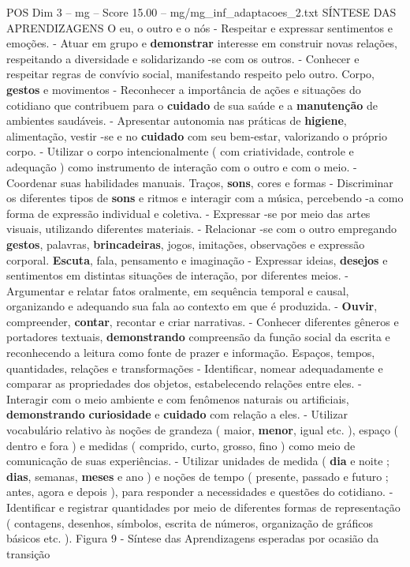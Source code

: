 \begin{textsample}{POS Dim 3 – mg – Score 15.00 – mg/mg\_inf\_adaptacoes\_2.txt}  \label{ex:f3_pos_268}
SÍNTESE DAS APRENDIZAGENS O eu, o outro e o nós - Respeitar e expressar sentimentos e emoções. - Atuar em grupo e \textbf{demonstrar} interesse em construir novas relações, respeitando a diversidade e solidarizando -se com os outros. - Conhecer e respeitar regras de convívio social, manifestando respeito pelo outro.
Corpo, \textbf{gestos} e movimentos - Reconhecer a importância de ações e situações do cotidiano que contribuem para o \textbf{cuidado} de sua saúde e a \textbf{manutenção} de ambientes saudáveis. - Apresentar autonomia nas práticas de \textbf{higiene}, alimentação, vestir -se e no \textbf{cuidado} com seu bem-estar, valorizando o próprio corpo. - Utilizar o corpo intencionalmente ( com criatividade, controle e adequação ) como instrumento de interação com o outro e com o meio. - Coordenar suas habilidades manuais.
Traços, \textbf{sons}, cores e formas - Discriminar os diferentes tipos de \textbf{sons} e ritmos e interagir com a música, percebendo -a como forma de expressão individual e coletiva. - Expressar -se por meio das artes visuais, utilizando diferentes materiais. - Relacionar -se com o outro empregando \textbf{gestos}, palavras, \textbf{brincadeiras}, jogos, imitações, observações e expressão corporal. \textbf{Escuta}, fala, pensamento e imaginação - Expressar ideias, \textbf{desejos} e sentimentos em distintas situações de interação, por diferentes meios. - Argumentar e relatar fatos oralmente, em sequência temporal e causal, organizando e adequando sua fala ao contexto em que é produzida. - \textbf{Ouvir}, compreender, \textbf{contar}, recontar e criar narrativas. - Conhecer diferentes gêneros e portadores textuais, \textbf{demonstrando} compreensão da função social da escrita e reconhecendo a leitura como fonte de prazer e informação.
Espaços, tempos, quantidades, relações e transformações - Identificar, nomear adequadamente e comparar as propriedades dos objetos, estabelecendo relações entre eles. - Interagir com o meio ambiente e com fenômenos naturais ou artificiais, \textbf{demonstrando} \textbf{curiosidade} e \textbf{cuidado} com relação a eles. - Utilizar vocabulário relativo às noções de grandeza ( maior, \textbf{menor}, igual etc. ), espaço ( dentro e fora ) e medidas ( comprido, curto, grosso, fino ) como meio de comunicação de suas experiências. - Utilizar unidades de medida ( \textbf{dia} e noite ; \textbf{dias}, semanas, \textbf{meses} e ano ) e noções de tempo ( presente, passado e futuro ; antes, agora e depois ), para responder a necessidades e questões do cotidiano. - Identificar e registrar quantidades por meio de diferentes formas de representação ( contagens, desenhos, símbolos, escrita de números, organização de gráficos básicos etc. ).
Figura 9 - Síntese das Aprendizagens esperadas por ocasião da transição

\end{textsample}
